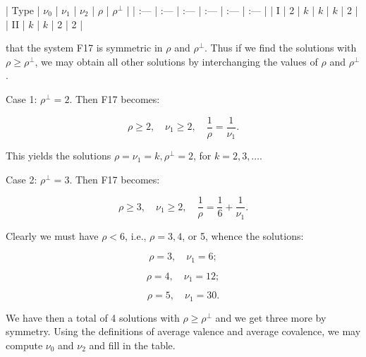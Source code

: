 | Type | $\nu_0$ | $\nu_1$ | $\nu_2$ | $\rho$ | $\rho^{\perp}$ |
| :--- | :--- | :--- | :--- | :--- | :--- |
| I | 2 | $k$ | $k$ | $k$ | 2 |
| II | $k$ | $k$ | 2 | 2 |

that the system F17 is symmetric in $\rho$ and $\rho^\perp$. Thus if we find the solutions with $\rho \geq \rho^\perp$, we may obtain all other solutions by interchanging the values of $\rho$ and $\rho^\perp$.

Case 1: $\rho^\perp = 2$. Then F17 becomes:

$$\rho \geq 2, \quad \nu_1 \geq 2, \quad \frac{1}{\rho} = \frac{1}{\nu_1}.$$

This yields the solutions $\rho = \nu_1 = k, \rho^\perp = 2$, for $k = 2, 3, \ldots$.

Case 2: $\rho^\perp = 3$. Then F17 becomes:

$$\rho \geq 3, \quad \nu_1 \geq 2, \quad \frac{1}{\rho} = \frac{1}{6} + \frac{1}{\nu_1}.$$

Clearly we must have $\rho < 6$, i.e., $\rho = 3, 4$, or 5, whence the solutions:

$$\rho = 3, \quad \nu_1 = 6;$$

$$\rho = 4, \quad \nu_1 = 12;$$

$$\rho = 5, \quad \nu_1 = 30.$$

We have then a total of 4 solutions with $\rho \geq \rho^\perp$ and we get three more by symmetry. Using the definitions of average valence and average covalence, we may compute $\nu_0$ and $\nu_2$ and fill in the table.
